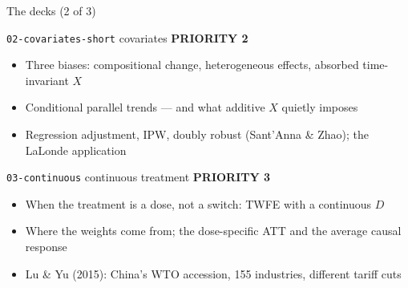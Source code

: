 \documentclass[aspectratio=169,11pt]{beamer}
\begin{document}
\begin{frame}{The decks (2 of 3)}
\vspace{0.2em}
\footnotesize
\begin{block}{\texttt{02-covariates-short} \;\textemdash\; covariates \hfill \textnormal{\small\color{accent}\bfseries PRIORITY 2}}
\begin{itemize}\setlength\itemsep{0.1em}
  \item Three biases: compositional change, heterogeneous effects, absorbed time-invariant $X$
  \item Conditional parallel trends --- and what additive $X$ quietly imposes
  \item Regression adjustment, IPW, doubly robust (Sant'Anna \& Zhao); the LaLonde application
\end{itemize}
\end{block}
\vspace{0.4em}
\begin{block}{\texttt{03-continuous} \;\textemdash\; continuous treatment \hfill \textnormal{\small\color{accent}\bfseries PRIORITY 3}}
\begin{itemize}\setlength\itemsep{0.1em}
  \item When the treatment is a dose, not a switch: TWFE with a continuous $D$
  \item Where the weights come from; the dose-specific ATT and the average causal response
  \item Lu \& Yu (2015): China's WTO accession, 155 industries, different tariff cuts
\end{itemize}
\end{block}
\end{frame}
\end{document}
